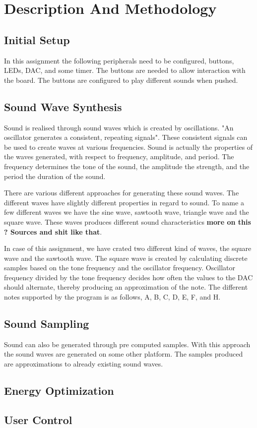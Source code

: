 \section{Description And Methodology}


\subsection{Initial Setup}
In this assignment the following peripherals need to be configured, buttons, LEDs, DAC, and some timer. The buttons are needed to allow interaction with the board. The buttons are configured to play different sounds when pushed. 




\subsection{Sound Wave Synthesis}
Sound is realised through sound waves which is created by oscillations. "An oscillator generates a consistent, repeating signals". These consistent signals can be used to create waves at various frequencies. Sound is actually the properties of the waves generated, with respect to frequency, amplitude, and period. The frequency determines the tone of the sound, the amplitude the strength, and the period the duration of the sound.  

There are various different approaches for generating these sound waves. The different waves have slightly different properties in regard to sound. To name a few different waves we have the sine wave, sawtooth wave, triangle wave and the square wave. These waves produces different sound characteristics {\bf more on this ? Sources and shit like that}. 

In case of this assignment, we have crated two different kind of waves, the square wave and the sawtooth wave. The square wave is created by calculating discrete samples based on the tone frequency and the oscillator frequency. Oscillator frequency divided by the tone frequency decides how often the values to the DAC should alternate, thereby producing an approximation of the note. The different notes supported by the program is as follows, A, B, C, D, E, F, and H.






\subsection{Sound Sampling}
Sound can also be generated through pre computed samples. With this approach the sound waves are generated on some other platform. The samples produced are approximations to already existing sound waves. 


\subsection{Energy Optimization}





\subsection{User Control}











